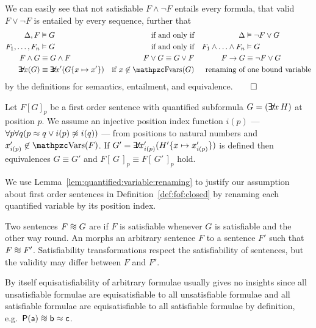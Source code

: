 \begin{example}
	We can easily see that not satisfiable \( F\land\lnot F \) entails every formula,
	that valid \( F\lor\lnot F \) is entailed by every sequence, further that
	\begin{align*}
	\Delta, F&\entails G  &\text{if and only if} && \Delta &\entails \lnot F\lor G
	\\
	F_1,\ldots,F_n&\entails G  &\text{if and only if} && F_1\land\ldots\land F_n&\entails G
	\\
	F\land G&\equival G\land F &F\lor G\equival G\lor F && F\limp G &\equival \lnot F\lor G
	\\
	\quantify x (G) &\equiv \quantify x' (G \{x\mapsto x'\} )
	&\text{if } x \not\in\fvar(G)
	&&\text{renaming of} &\text{ one bound variable}
	\end{align*}
	by the definitions for semantics, entailment, and equivalence.\hfill \( \qed \)
\end{example}

\begin{lemma}\label{lem:quantified:variable:renaming}
	Let \( {F[G]}_p \)
	be a first order sentence with quantified subformula
	\( G = (\quantify x\,H) \) at position \( p \).
	We assume an injective position index function \( i(p) \)
	--- \( \forall p \forall q (p \approx q \lor i(p) \not\approx i(q)  ) \) ---
	from positions to natural numbers
	and \( x'_{i(p)} \not\in\var(F) \).
	If \( G' = \quantify x'_{i(p)} (H'\{x\mapsto x'_{i(p)}\}) \)
	is defined then equivalences
	\( G \equiv G' \) and
	\(
		{F[\,G\,]}_p
		\equiv
		{F[\,G'\,]}_p
	\) hold.
\end{lemma}

\noindent We use Lemma~\ref{lem:quantified:variable:renaming}
to justify our assumption about first order sentences
in Definition~\ref{def:fof:closed} by renaming each
quantified variable by its position index.

\begin{definition}\label{def:equisatisfiable}
	Two sentences \( F \equisat G \) are 
	if \( F \) is satisfiable whenever \( G \) is satisfiable
	and the other way round.
	An  morphs an arbitrary sentence
	\( F \) to a sentence \( F' \) such that \( F \equisat F' \).
	Satisfiability transformations respect the satisfiability of sentences,
	but the validity may differ between \( F \) and \( F' \).
\end{definition}

\begin{remark}
	By itself equisatisfiability of arbitrary formulae
	usually gives no insights since
	all unsatisfiable formulae are equisatisfiable to all unsatisfiable formulae
	and all satisfiable formulae are equisatisfiable to all satisfiable formulae by definition,
	e.g.\ \(\mP(\ma) \equisat \mb\mEQ\mc \). %
\end{remark}


